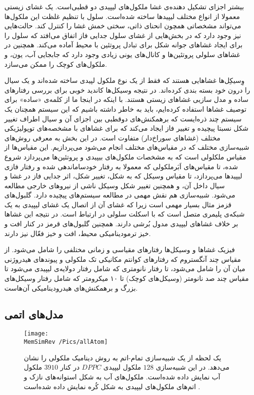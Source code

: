 بیشتر اجزای تشکیل دهنده‌ی غشا ملکول‌های لیپیدی دو قطبی‌است. یک غشای زیستی معمولا از انواع مختلف لیپید‌ها ساخته شده‌است. سلول با تنظیم غلظت این ملکول‌ها می‌تواند مشخصاتی همچون انحنای ذاتی، سختی خمش غشا را کنترل کند. حالت‌هایی نیز وجود دارد که در بخش‌هایی از غشای سلول جدایی فاز اتفاق می‌افتد که سلول را برای ایجاد غشاهای جوانه شکل برای تبادل پروتئین با محیط آماده می‌کند. همچنین در غشاهای سلولی پروتئین‌ها و کانال‌های یونی زیادی وجود دارد که جابجایی آب، یون، و ملکول‌های کوچک را ممکن می‌سازد.


وِسیکِل‌ها
 غشاهایی هستند که فقط از یک نوع ملکول‌ لپیدی ساخته ‌شده‌اند و یک سیال را درون خود بسته بندی کرده‌اند. در نتیجه وسیکل‌ها کاندید خوبی برای بررسی رفتارهای ساده‌ و مدل سازیی غشاهای زیستی هستند. با اینکه در اینجا ما از کلمه‌ی «ساده» برای توصیف غشاها استفاده کرده‌ایم، باید به خاطر داشته باشیم که این سیستم همچنان یک سیستم چند ذره‌ایست که برهمکنش‌های دوقطبی بین اجزای آن و سیال اطراف تغییر شکل‌  نسبتا پیچیده‌ و تغییر فاز ایجاد می‌کند که برای غشاهای با مشخصه‌های توپولیژیکی مختلف (غشاهای سوراخ‌دار) متفاوت است. در این بخش به معرفی روش‌های شبیه‌سازی مختلف که در مقیاس‌های مختلف انجام می‌شود می‌پردازیم. این مقیاس‌ها از مقیاس ملکلولی است که به مشخصات ملکول‌های بیپیدی و پروتئین‌ها می‌پردازد شروع شده، تا مقیاس‌های اَبَرملکولی
 که معمولا به رفتار خودساماندهی شده و رفتار فازی لیپید‌ها می‌پردازد، تا مقیاس وسیکل که به شکل، تغییر شکل، اثر جدایی فاز در غشا و سیال داخل آن، و همچنین تغییر شکل وسیکل ناشی از نیروهای خارجی مطالعه می‌شود. شبیه‌سازی هم نقش مهمی در مطالعه سیستم‌های پیچیده دارد. گلبول‌های قزمز مثال بسیار مهمی‌ است زیرا که غشای آن از اتصال یک غشای لیپیدی به یک شبکه‌ی پلیمری متصل است که با اسکلت سلولی در ارتباط است. در نتیجه این غشاها بر خلاف غشاهای لیپیدی مدول بُرشی
 دارند. همچنین گلبول‌های قرمز در کنار افت و خیز ترمودینامیکی محیط، افت و خیز فعّال نیز دارند.
 
 
 فیزیک غشا‌ها و وسیکل‌ها رفتار‌های مقیاسی و زمانی مختلفی را شامل می‌شود. از مقیاس چند آنگستروم که رفتارهای کوانتم مکانیکی تک ملکولی و پیوندهای هیدروژنی میان آن را شامل می‌شود، تا رفتار نانومتری که شامل رفتار دولایه‌ی لیپیدی می‌شود تا مقیاس چند صد نانومتر (وسیکل‌های کوچک) تا ۱۰ میکرومتر که شامل رفتار وسیکل‌های بزرگ و برهمکنش‌های هیدرودینامیکی آن‌هاست.
 
 
 \subsection{
 مدل‌های اتمی
 }
 
\begin{figure}[h]
\begin{center}
\texttt{[image: \\MemSimRev /Pics/allAtom]}
\caption{
یک لحظه از یک شبیه‌سازی تمام-اتم به روش دینامیک ملکولی را نشان می‌دهد. در این شبیه‌سازی
$128$
ملکول لیپیدی
$DPPC$
در کنار
$3910$
ملکول آب نمایش داده شده‌است. ملکول‌های آب به شکل استوانه‌های نازک و اتم‌های ملکول‌های لیپیدی به شکل کُره‌ نمایش داده شده‌است
\cite{Tieleman1997}.
}
\label{fig:allAtom}
\end{center}
\end{figure}


